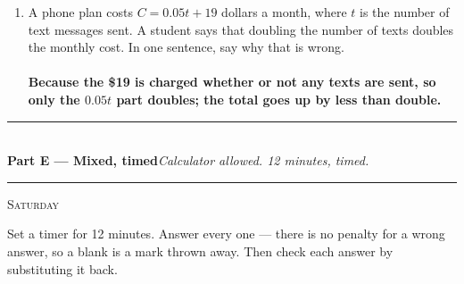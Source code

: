 \documentclass[11pt,a4paper]{article}
\newif\ifANSWERS
\newcommand{\PartHead}[2]{%
  \vspace{6pt}
  {\color{navy}\rule{\textwidth}{0.8pt}}\\[2pt]
  {\large\bfseries\color{navy}#1}\hfill{\small\itshape #2}\\[-4pt]
  {\color{navy}\rule{\textwidth}{0.4pt}}
  \vspace{4pt}
}
\newcommand{\sitting}[1]{{\footnotesize\textsc{\color{navy}#1}}\par\vspace{2pt}}
\newcommand{\ans}[1]{\ {\color{keyred}\bfseries #1}}
\newcommand{\ans}[1]{}
\begin{document}
\begin{enumerate}[leftmargin=20pt,itemsep=10pt]
\item A phone plan costs $C=0.05t+19$ dollars a month, where $t$ is the number of text
  messages sent. A student says that doubling the number of texts doubles the monthly
  cost. In one sentence, say why that is wrong.\\
  \underline{\hspace{\linewidth}}
  \ans{\\ Because the \$19 is charged whether or not any texts are sent, so only the
  $0.05t$ part doubles; the total goes up by less than double.}
\end{enumerate}

\ifANSWERS\else\newpage\fi
\PartHead{Part E --- Mixed, timed}{Calculator allowed. 12 minutes, timed.}
\sitting{Saturday}
Set a timer for 12 minutes. Answer every one --- there is no penalty for a wrong answer,
so a blank is a mark thrown away. Then check each answer by substituting it back.
\end{document}
